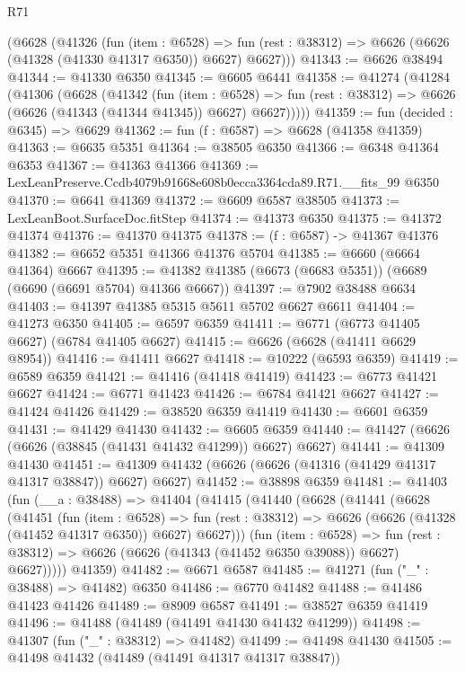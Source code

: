 \begin{lexlean}{R71}
\begin{coremodule}
    (@6628
      (@41326
        (fun (item : @6528) =>
        fun (rest : @38312) => @6626 (@6626 (@41328 (@41330 @41317 @6350)) @6627) @6627)))
@41343 := @6626 @38494
@41344 := @41330 @6350
@41345 := @6605 @6441
@41358 := @41274
    (@41284
      (@41306
        (@6628
          (@41342
            (fun (item : @6528) =>
            fun (rest : @38312) => @6626 (@6626 (@41343 (@41344 @41345)) @6627) @6627)))))
@41359 := fun (decided : @6345) => @6629
@41362 := fun (f : @6587) => @6628 (@41358 @41359)
@41363 := @6635 @5351
@41364 := @38505 @6350
@41366 := @6348 @41364 @6353
@41367 := @41363 @41366
@41369 := LexLeanPreserve.Ccdb4079b91668e608b0ecca3364cda89.R71.__fits_99 @6350
@41370 := @6641 @41369
@41372 := @6609 @6587 @38505
@41373 := LexLeanBoot.SurfaceDoc.fitStep
@41374 := @41373 @6350
@41375 := @41372 @41374
@41376 := @41370 @41375
@41378 := (f : @6587) -> @41367 @41376
@41382 := @6652 @5351 @41366 @41376 @5704
@41385 := @6660 (@6664 @41364) @6667
@41395 := @41382 @41385 (@6673 (@6683 @5351)) (@6689 (@6690 (@6691 @5704) @41366 @6667))
@41397 := @7902 @38488 @6634
@41403 := @41397 @41385 @5315 @5611 @5702 @6627 @6611
@41404 := @41273 @6350
@41405 := @6597 @6359
@41411 := @6771 (@6773 @41405 @6627) (@6784 @41405 @6627)
@41415 := @6626 (@6628 (@41411 @6629 @8954))
@41416 := @41411 @6627
@41418 := @10222 (@6593 @6359)
@41419 := @6589 @6359
@41421 := @41416 (@41418 @41419)
@41423 := @6773 @41421 @6627
@41424 := @6771 @41423
@41426 := @6784 @41421 @6627
@41427 := @41424 @41426
@41429 := @38520 @6359 @41419
@41430 := @6601 @6359
@41431 := @41429 @41430
@41432 := @6605 @6359
@41440 := @41427 (@6626 (@6626 (@38845 (@41431 @41432 @41299)) @6627) @6627)
@41441 := @41309 @41430
@41451 := @41309 @41432 (@6626 (@6626 (@41316 (@41429 @41317 @41317 @38847)) @6627) @6627)
@41452 := @38898 @6359
@41481 := @41403
    (fun (__a : @38488) =>
    @41404
      (@41415
        (@41440
          (@6628
            (@41441
              (@6628
                (@41451
                  (fun (item : @6528) =>
                  fun (rest : @38312) => @6626 (@6626 (@41328 (@41452 @41317 @6350)) @6627) @6627)))
              (fun (item : @6528) =>
              fun (rest : @38312) => @6626 (@6626 (@41343 (@41452 @6350 @39088)) @6627) @6627)))))
      @41359)
@41482 := @6671 @6587
@41485 := @41271 (fun ("_" : @38488) => @41482) @6350
@41486 := @6770 @41482
@41488 := @41486 @41423 @41426
@41489 := @8909 @6587
@41491 := @38527 @6359 @41419
@41496 := @41488 (@41489 (@41491 @41430 @41432 @41299))
@41498 := @41307 (fun ("_" : @38312) => @41482)
@41499 := @41498 @41430
@41505 := @41498 @41432 (@41489 (@41491 @41317 @41317 @38847))

\end{coremodule}
\end{lexlean}
